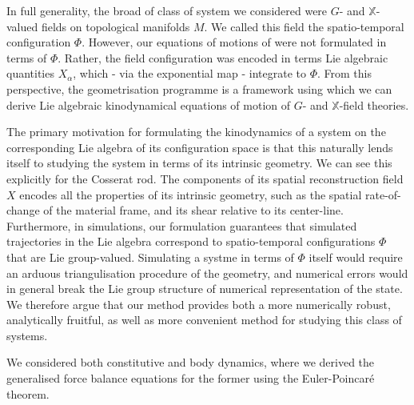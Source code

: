 In full generality, the broad of class of system we considered were $G$- and $\mathbb{X}$-valued fields on topological manifolds $M$. We called this field the spatio-temporal configuration $\Phi$. However, our equations of motions of were not formulated in terms of $\Phi$. Rather, the field configuration was encoded in terms Lie algebraic quantities $X_\alpha$, which - via the exponential map - integrate to $\Phi$. From this perspective, the geometrisation programme is a framework using which we can derive Lie algebraic kinodynamical equations of motion of $G$- and $\mathbb{X}$-field theories.

The primary motivation for formulating the kinodynamics of a system on the corresponding Lie algebra of its configuration space is that this naturally lends itself to studying the system in terms of its intrinsic geometry. We can see this explicitly for the Cosserat rod. The components of its spatial reconstruction field $X$ encodes all the properties of its intrinsic geometry, such as the spatial rate-of-change of the material frame, and its shear relative to its center-line. Furthermore, in simulations, our formulation guarantees that simulated trajectories in the Lie algebra correspond to spatio-temporal configurations $\Phi$ that are Lie group-valued. Simulating a systme in terms of $\Phi$ itself would require an arduous triangulisation procedure of the geometry, and numerical errors would in general break the Lie group structure of numerical representation of the state. We therefore argue that our method provides both a more numerically robust, analytically fruitful, as well as more convenient method for studying this class of systems.



We considered both constitutive and body dynamics, where we derived the generalised force balance equations for the former using the Euler-Poincaré theorem.

